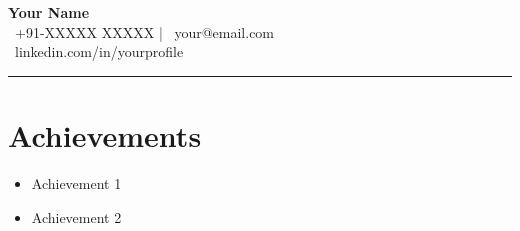 \documentclass[10pt]{article}
\newcommand{\headerinfo}[3]{
  \begin{center} {\Huge \bfseries #1} \\ \vspace{2pt}
  {#2} \\ \vspace{1pt} {#3} \end{center} \hrule \vspace{0.2cm}
}
\begin{document}
\headerinfo{Your Name}{\faMobile\ +91-XXXXX XXXXX | \faEnvelope\ your@email.com}{\faLinkedin\ linkedin.com/in/yourprofile}
\section*{Achievements}
\begin{itemize}
\item Achievement 1
\item Achievement 2
\end{itemize}
\end{document}
